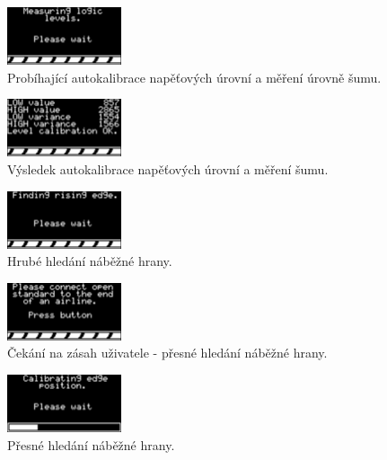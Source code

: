 \begin{figure}[H]
\includegraphics[width=0.3\textwidth,keepaspectratio,interpolate=false]{images/levels_user_wait.png}\caption{Probíhající autokalibrace napěťových úrovní a měření úrovně šumu.}\label{levels_user_wait}
\end{figure}

\begin{figure}[H]
\includegraphics[width=0.3\textwidth,keepaspectratio,interpolate=false]{images/levels_complete.png}\caption{Výsledek autokalibrace napěťových úrovní a měření šumu.}\label{levels_complete}
\end{figure}

\begin{figure}[H]
\includegraphics[width=0.3\textwidth,keepaspectratio,interpolate=false]{images/edge_wait.png}\caption{Hrubé hledání náběžné hrany.}\label{edge_wait}
\end{figure}

\begin{figure}[H]
\includegraphics[width=0.3\textwidth,keepaspectratio,interpolate=false]{images/edge_user_wait.png}\caption{Čekání na zásah uživatele - přesné hledání náběžné hrany.}\label{edge_user_wait}
\end{figure}

\begin{figure}[H]
\includegraphics[width=0.3\textwidth,keepaspectratio,interpolate=false]{images/edge_sampling.png}\caption{Přesné hledání náběžné hrany.}\label{edge_sampling}
\end{figure}

